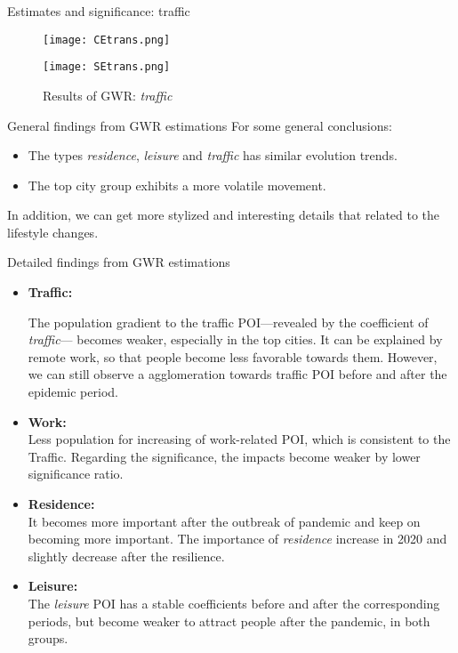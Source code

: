 \documentclass[aspectratio=169,xcolor=dvipsnames]{beamer}
\begin{document}
\begin{frame}{Estimates and significance: traffic}
	\begin{figure}[h]
		\centering
		\begin{minipage}[b]{0.49\textwidth}
			\texttt{[image: CEtrans.png]}
			\caption{Coefficient of \textit{traffic}}
			\label{fig:CE_trans}
		\end{minipage}
		\hfill %
		\begin{minipage}[b]{0.49\textwidth}
			\texttt{[image: SEtrans.png]}
			\caption{Significance of \textit{traffic}}
			\label{fig:SE_trans}
		\end{minipage}
		\caption{Results of GWR: \textit{traffic}}
	\end{figure}
\end{frame}
\begin{frame}{General findings from GWR estimations}
	For some general conclusions:
	\begin{itemize}
	\item The types \textit{residence}, \textit{leisure} and \textit{traffic} has similar evolution trends.
	\item The top city group exhibits a more volatile movement.
	\end{itemize}
	In addition, we can get more stylized and interesting details that related to the lifestyle changes.
\end{frame}
\begin{frame}{Detailed findings from GWR estimations}
		\begin{itemize}
		\item \textbf{Traffic:}\par 
		The population gradient to the traffic POI---revealed by the coefficient of \textit{traffic}--- becomes weaker, especially in the top cities. It can be explained by remote work, so that people become less favorable towards them. However, we can still observe a agglomeration towards traffic POI before and after the epidemic period.
		\item \textbf{Work:}\\
		Less population for increasing of work-related POI, which is consistent to the Traffic. Regarding the significance, the impacts become weaker by lower significance ratio.
		\item \textbf{Residence:}\\
		It becomes more important after the outbreak of pandemic and keep on becoming more important. The importance of \textit{residence} increase in 2020 and slightly decrease after the resilience.
		\item \textbf{Leisure:}\\
		The \textit{leisure} POI has a stable coefficients before and after the corresponding periods, but become weaker to attract people after the pandemic, in both groups.
	\end{itemize}
\end{frame}
\end{document}
